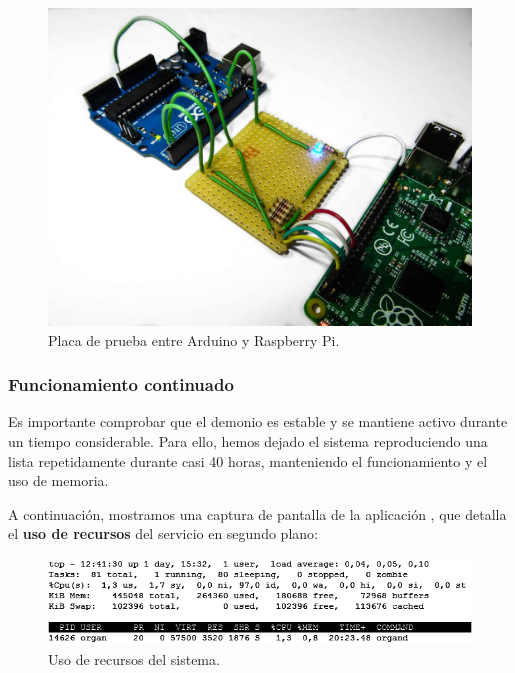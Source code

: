 \begin{figure}[H]
	\noindent \begin{centering}
		\includegraphics[width=\linewidth*3/4]{capitulo6/proto_uart}
		\par\end{centering}
	\smallskip
	\caption{\label{fig:proto_uart} Placa de prueba entre Arduino y Raspberry Pi.}
\end{figure} 

\smallskip

\subsubsection{Funcionamiento continuado}

Es importante comprobar que el demonio es estable y se mantiene activo durante un tiempo considerable. Para ello, hemos dejado el sistema reproduciendo una lista repetidamente durante casi 40 horas, manteniendo el funcionamiento y el uso de memoria.

A continuación, mostramos una captura de pantalla de la aplicación , que detalla el \textbf{uso de recursos} del servicio en segundo plano:

\smallskip

\begin{figure}[H]
	\noindent \begin{centering}
		\includegraphics[width=\linewidth*3/4]{capitulo6/cap_top}
		\par\end{centering}
	\smallskip
	\caption{\label{fig:cap_top} Uso de recursos del sistema.}
\end{figure} 

